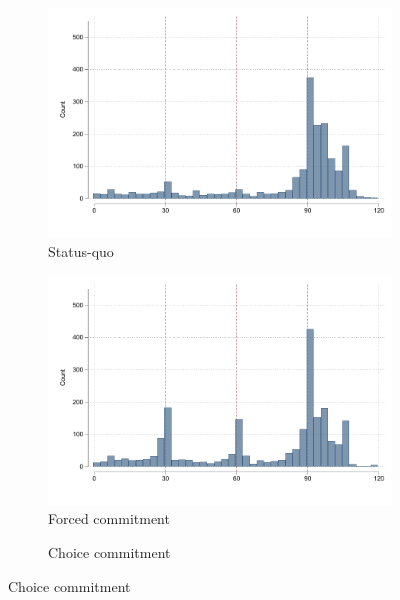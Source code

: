 \documentclass[oneside,11pt]{article}
\begin{document}
\begin{figure}[H]
    \caption{Histogram of payments}
    \label{hist_payments}
    \begin{center}
    \begin{subfigure}{0.31\textwidth}
        \caption{Status-quo}
        \centering
        \includegraphics[width=\textwidth]{Figuras/hist_payments_sq.pdf}
    \end{subfigure}
    \begin{subfigure}{0.31\textwidth}
        \caption{Forced commitment}
        \centering
        \includegraphics[width=\textwidth]{Figuras/hist_payments_fc.pdf}
    \end{subfigure}
    \begin{subfigure}{0.31\textwidth}
        \caption{Choice commitment}
        \centering

\end{subfigure}
\end{center}
\end{figure}
\end{document}
